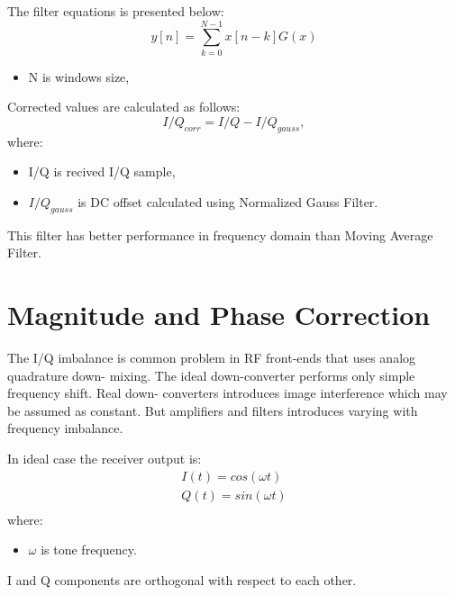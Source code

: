 \documentclass[en,printmode]{mgr}
\begin{document}
			The filter equations is presented below:
			\begin{equation}
				y[n] = \sum_{k=0}^{N-1}x[n-k]G(x) \label{eq:gauss}
			\end{equation}
			\begin{itemize}
				\item N is windows size,
			\end{itemize}			
			Corrected values are calculated as follows:
			\[
				I/Q_{corr} = I/Q - I/Q_{gauss},
			\]
						where:
			\begin{itemize}
				\item I/Q is recived I/Q sample,
				\item $I/Q_{gauss}$ is DC offset calculated using Normalized Gauss Filter.
			\end{itemize}
			This filter has better performance in frequency domain than Moving Average Filter.
	\section{Magnitude and Phase Correction}
		The I/Q imbalance is common problem in RF front-ends that uses analog quadrature down-
		mixing. The ideal down-converter performs only simple frequency shift. Real down-
	    converters introduces image interference which may be assumed as constant. But amplifiers
	    and filters introduces varying with frequency imbalance.
	    
	    In ideal case the receiver output is:
		\begin{equation}
			\renewcommand*{\arraystretch}{1.3} 
			\begin{array}{ll}
				I(t) = cos(\omega t) \\
				Q(t) = sin(\omega t) \\
			\end{array}
		\end{equation}
		where:
		\begin{itemize}
			\item $\omega$ is tone frequency.
		\end{itemize}
	    I and Q components are orthogonal with respect to each other.
	    
\end{document}
